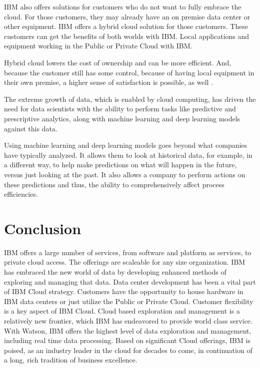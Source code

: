 IBM also offers solutions for customers who do not want to fully embrace the cloud.  For those customers, they may already have an on premise data center or other equipment.  IBM offers a hybrid cloud solution for those customers.  These customers can get the benefits of both worlds with IBM.  Local applications and equipment working in the Public or Private Cloud with IBM.  

Hybrid cloud lowers the cost of ownership and can be more efficient.  And, because the customer still has some control, because of having local equipment in their own premise, a higher sense of satisfaction is possible, as well \cite{hid-sp18-525-hybrid}.  

The extreme growth of data, which is enabled by cloud computing, has driven the need for data scientists with the ability to perform tasks like predictive and prescriptive analytics, along with machine learning and deep learning models against this data.  

Using machine learning and deep learning models goes beyond what companies have typically analyzed.  It allows them to look at historical data, for example, in a different way, to help make predictions on what will happen in the future, versus just looking at the past.  It also allows a company to perform actions on these predictions and thus, the ability to comprehensively affect process efficiencies.  
 
 \section{Conclusion}
 IBM offers a large number of services, from software and platform as services, to private cloud access.  The offerings are scaleable for any size organization.  IBM has embraced the new world of data by developing enhanced methods of exploring and managing that data.  Data center development has been a vital part of IBM Cloud strategy.  Customers have the opportunity to house hardware in IBM data centers or just utilize the Public or Private Cloud.  Customer flexibility is a key aspect of IBM Cloud.  Cloud based exploration and management is a relatively new frontier, which IBM has endeavored to provide world class service.  With Watson, IBM offers the highest level of data exploration and management, including real time data processing.  Based on significant Cloud offerings, IBM is poised, as an industry leader in the cloud for decades to come, in continuation of a long, rich tradition of business excellence.
 
 





